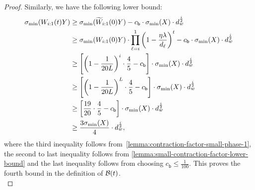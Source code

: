 \begin{proof}
  Similarly, we have the following lower bound:
  \begin{align*}
    \sigma_{\min}(W_{i:1}(t) Y) &\geq
    \sigma_{\min}(\widetilde{W}_{i:1}(0) Y) - c_{\mathsf{b}} \cdot \sigma_{\min}(X) \cdot d_{w}^{\frac{i}{2}} \\
                                &\geq
                                \sigma_{\min}(W_{i:1}(0) Y) \cdot \prod_{\ell = i}^{1} \left(1 - \frac{\eta \lambda}{d_{\ell}}\right)^{t}
    - c_{\mathsf{b}} \cdot \sigma_{\min}(X) \cdot d_{w}^{\frac{i}{2}} \\
                                &\geq
                                \left[ \left(1 - \frac{1}{20L}\right)^{i} \cdot \frac{4}{5} - c_{\mathsf{b}} \right] \cdot \sigma_{\min}(X) \cdot d_{w}^{\frac{i}{2}} \\
                                &\geq
                                \left[ \left(1 - \frac{1}{20L}\right)^{L} \cdot \frac{4}{5} - c_{\mathsf{b}} \right] \cdot \sigma_{\min}(X) \cdot d_{w}^{\frac{i}{2}} \\
                                &\geq
    \left[ \frac{19}{20} \cdot \frac{4}{5} - c_{\mathsf{b}} \right] \cdot \sigma_{\min}(X) \cdot d_{w}^{\frac{i}{2}} \\
                                &\geq
                                \frac{3 \sigma_{\min}(X)}{4} \cdot d_{w}^{\frac{i}{2}},
  \end{align*}
  where the third inequality follows from~\cref{lemma:contraction-factor-small-phase-1}, the second to last inequality follows from \cref{lemma:small-contraction-factor-lower-bound} and the last
  inequality follows from choosing $c_{\mathsf{b}} \leq \frac{1}{100}$. This proves the fourth bound
  in the definition of $\mathcal{B}(t)$.\\
  

\end{proof}

